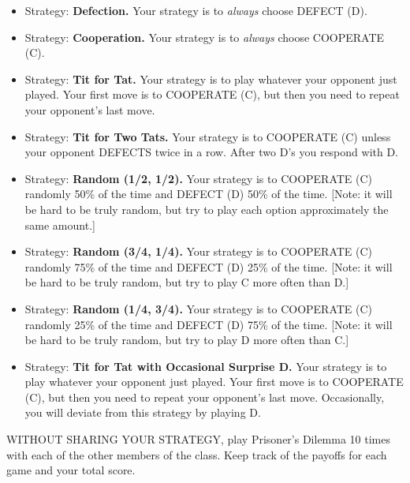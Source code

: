 \begin{itemize}
\item Strategy: {\bf Defection.} Your strategy is to {\it always} choose DEFECT (D).
\vspace{.2in}
\item Strategy: {\bf Cooperation.} Your strategy is to {\it always} choose COOPERATE (C).
\vspace{.2in}
\item Strategy: {\bf Tit for Tat.} Your strategy is to play whatever your opponent just played. Your first move is to COOPERATE (C), but then you need to repeat your opponent's last move. 
\vspace{.2in}

\item Strategy: {\bf Tit for Two Tats.} Your strategy is to COOPERATE (C) unless your opponent DEFECTS twice in a row. After two D's you respond with D. 
\vspace{.2in}

\item Strategy: {\bf Random (1/2, 1/2).} Your strategy is to COOPERATE (C) randomly 50\% of the time and DEFECT (D) 50\% of the time. [Note: it will be hard to be truly random, but try to play each option approximately the same amount.]
\vspace{.2in}

\item Strategy: {\bf Random (3/4, 1/4).} Your strategy is to COOPERATE (C) randomly 75\% of the time and DEFECT (D) 25\% of the time. [Note: it will be hard to be truly random, but try to play C more often than D.]
\vspace{.2in}

\item Strategy: {\bf Random (1/4, 3/4).} Your strategy is to COOPERATE (C) randomly 25\% of the time and DEFECT (D) 75\% of the time. [Note: it will be hard to be truly random, but try to play D more often than C.]
\vspace{.2in}

\item Strategy: {\bf Tit for Tat with Occasional Surprise D.} Your strategy is to play whatever your opponent just played. Your first move is to COOPERATE (C), but then you need to repeat your opponent's last move. Occasionally, you will deviate from this strategy by playing D.
\vspace{.2in}
\end{itemize}


\begin{xca}\label{E:RPDplaytournament}
WITHOUT SHARING YOUR STRATEGY, play Prisoner's Dilemma 10 times with each of the other members of the class. Keep track of the payoffs for each game and your total score.
\end{xca}

